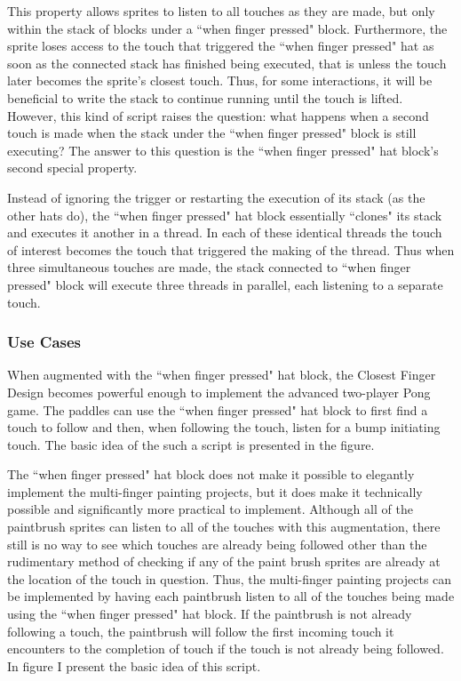 This property allows sprites to listen to all touches as they are made, but only within the stack of blocks under a ``when finger pressed" block. Furthermore, the sprite loses access to the touch that triggered the ``when finger pressed" hat as soon as the connected stack has finished being executed, that is unless the touch later becomes the sprite's closest touch. Thus, for some interactions, it will be beneficial to write the stack to continue running until the touch is lifted. However, this kind of script raises the question: what happens when a second touch is made when the stack under the ``when finger pressed" block is still executing? The answer to this question is the ``when finger pressed" hat block's second special property.

Instead of ignoring the trigger or restarting the execution of its stack (as the other hats do), the ``when finger pressed" hat block essentially ``clones" its stack and executes it another in a thread. In each of these identical threads the touch of interest becomes the touch that triggered the making of the thread. Thus when three simultaneous touches are made, the stack connected to ``when finger pressed" block will execute three threads in parallel, each listening to a separate touch.
 
\subsubsection{Use Cases}

When augmented with the ``when finger pressed" hat block, the Closest Finger Design becomes powerful enough to implement the advanced two-player Pong game. The paddles can use the ``when finger pressed" hat block to first find a touch to follow and then, when following the touch, listen for a bump initiating touch. The basic idea of the such a script is presented in the figure.

The ``when finger pressed" hat block does not make it possible to elegantly implement the multi-finger painting projects, but it does make it technically possible and significantly more practical to implement. Although all of the paintbrush sprites can listen to all of the touches with this augmentation, there still is no way to see which touches are already being followed other than the rudimentary method of checking if any of the paint brush sprites are already at the location of the touch in question. Thus, the multi-finger painting projects can be implemented by having each paintbrush listen to all of the touches being made using the ``when finger pressed" hat block. If the paintbrush is not already following a touch, the paintbrush will follow the first incoming touch it encounters to the completion of touch if the touch is not already being followed. In figure I present the basic idea of this script.

